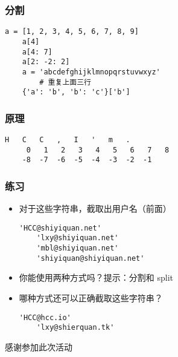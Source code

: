 \begin{CJK}{UTF8}{gbsn}
\begin{frame} [fragile]
	\frametitle{分割}
	\linespread{1.5}
	\begin{lstlisting}[style=pythonstyle, gobble=4, texcl]
	a = [1, 2, 3, 4, 5, 6, 7, 8, 9]
	a[4]
	a[4: 7]
	a[2: -2: 2]
	a = 'abcdefghijklmnopqrstuvwxyz'
		# 重复上面三行
	{'a': 'b', 'b': 'c'}['b']
	\end{lstlisting}
\end{frame}

\begin{frame} [fragile]
	\frametitle{原理}
	\linespread{2}
	\begin{lstlisting}[basicstyle=\ttfamily,upquote=true,
						showstringspaces=false,tabsize=4,columns=fixed]
	   H   C   C   ,   I   '   m   .
	 0   1   2   3   4   5   6   7   8
	-8  -7  -6  -5  -4  -3  -2  -1
	\end{lstlisting}
\end{frame}

\begin{frame} [fragile]
	\frametitle{练习}
	\linespread{1.5}
	\begin{itemize}
	\item 对于这些字符串，截取出用户名（前面）
	\begin{lstlisting}[style=pythonstyle, gobble=4, texcl]
	'HCC@shiyiquan.net'
	'lxy@shiyiquan.net'
	'mbl@shiyiquan.net'
	'shiyiquan@shiyiquan.net'
	\end{lstlisting}
	\item 你能使用两种方式吗？提示：分割和 split
	\item 哪种方式还可以正确截取这些字符串？
	\begin{lstlisting}[style=pythonstyle, gobble=4, texcl]
	'HCC@hcc.io'
	'lxy@shierquan.tk'
	\end{lstlisting}
	\end{itemize}
\end{frame}


\PreLastFrame
\begin{frame}
	\centerline{\fontsize{32}{32}\selectfont 感谢参加此次活动}
\end{frame}

\newpage
\end{CJK}


